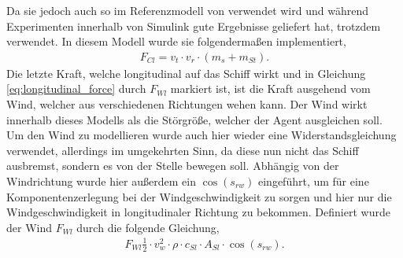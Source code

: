 \documentclass[]{iat}
\begin{document}
Da sie jedoch auch so im Referenzmodell von \cite[Knud Benedict \& Matthias Kirchhoff]{Benedict2007ExplainingSD} verwendet wird und während Experimenten innerhalb von Simulink gute Ergebnisse geliefert hat, trotzdem verwendet. In diesem Modell wurde sie folgendermaßen implementiert,
\begin{align}
    F_{Cl} = v_t \cdot v_r \cdot (m_{s}+ m_{St}).
\end{align}
Die letzte Kraft, welche longitudinal auf das Schiff wirkt und in Gleichung \ref{eq:longitudinal_force} durch $F_{Wl}$ markiert ist, ist die Kraft ausgehend vom Wind, welcher aus verschiedenen Richtungen wehen kann. Der Wind wirkt innerhalb dieses Modells als die Störgröße, welcher der Agent ausgleichen soll. Um den Wind zu modellieren wurde auch hier wieder eine Widerstandsgleichung verwendet, allerdings im umgekehrten Sinn, da diese nun nicht das Schiff ausbremst, sondern es von der Stelle bewegen soll. Abhängig von der Windrichtung wurde hier außerdem ein $\cos(s_{rw})$ eingeführt, um für eine Komponentenzerlegung bei der Windgeschwindigkeit zu sorgen und hier nur die Windgeschwindigkeit in longitudinaler Richtung zu bekommen. Definiert wurde der Wind $F_{Wl}$ durch die folgende Gleichung,
\begin{align}
    F_{Wl} \frac{1}{2} \cdot v_w^2 \cdot \rho \cdot c_{Sl} \cdot A_{Sl} \cdot \cos(s_{rw}). \label{eq:wind_wl}
\end{align}
\end{document}
